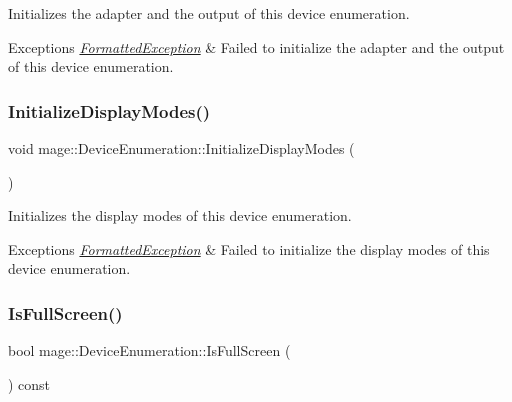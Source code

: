 Initializes the adapter and the output of this device enumeration.


\begin{DoxyExceptions}{Exceptions}
{\em \hyperlink{structmage_1_1_formatted_exception}{Formatted\+Exception}} & Failed to initialize the adapter and the output of this device enumeration. \\
\hline
\end{DoxyExceptions}
\hypertarget{classmage_1_1_device_enumeration_af6411210d27162b033afcb9693dec301}{}\label{classmage_1_1_device_enumeration_af6411210d27162b033afcb9693dec301} 
\subsubsection{\texorpdfstring{Initialize\+Display\+Modes()}{InitializeDisplayModes()}}
{\footnotesize\ttfamily void mage\+::\+Device\+Enumeration\+::\+Initialize\+Display\+Modes (\begin{DoxyParamCaption}{ }\end{DoxyParamCaption})\hspace{0.3cm}{\ttfamily [private]}}

Initializes the display modes of this device enumeration.


\begin{DoxyExceptions}{Exceptions}
{\em \hyperlink{structmage_1_1_formatted_exception}{Formatted\+Exception}} & Failed to initialize the display modes of this device enumeration. \\
\hline
\end{DoxyExceptions}
\hypertarget{classmage_1_1_device_enumeration_a8957ecacc567708e80694b25aa141c4e}{}\label{classmage_1_1_device_enumeration_a8957ecacc567708e80694b25aa141c4e} 
\subsubsection{\texorpdfstring{Is\+Full\+Screen()}{IsFullScreen()}}
{\footnotesize\ttfamily bool mage\+::\+Device\+Enumeration\+::\+Is\+Full\+Screen (\begin{DoxyParamCaption}{ }\end{DoxyParamCaption}) const}

